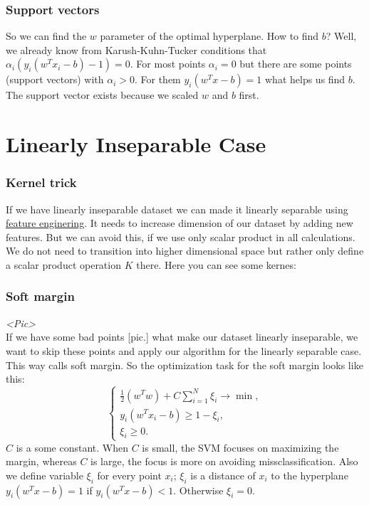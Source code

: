 \subsubsection*{Support vectors}

So we can find the $w$ parameter of the optimal hyperplane. How to find $b$? Well, we already know from Karush-Kuhn-Tucker conditions that $\alpha_i(y_i(w^Tx_i-b)-1)=0$. For most points $\alpha_i=0$ but there are some points (support vectors) with $\alpha_i>0$. For them $y_i(w^Tx-b)=1$ what helps us find $b$. The support vector exists because we scaled $w$ and $b$ first.

\section{Linearly Inseparable Case}
\vspace{-0.6cm}
\subsubsection*{Kernel trick}

If we have linearly inseparable dataset we can made it linearly separable using \hyperlink{new_features}{feature enginering}. It needs to increase dimension of our dataset by adding new features. But we can avoid this, if we use only scalar product in all calculations. We do not need to transition into higher dimensional space but rather only
define a scalar product operation $K$ there. Here you can see some kernes:\\
{\it <Pics with examples>}

\subsubsection*{Soft margin}

{\it <Pic>}\\
If we have some bad points [pic.] what make our dataset linearly inseparable, we want to skip these points and apply our algorithm for the linearly separable case. This way calls soft margin. So the optimization task for the soft margin looks like this:
$$\begin{cases}
	\frac{1}{2}(w^Tw)+C\sum\limits_{i=1}^{N}\xi_i\to\min, \\
	y_i(w^Tx_i-b)\ge1-\xi_i, \\
	\xi_i\ge0.
\end{cases}$$
$C$ is a some constant. When $C$ is small, the SVM focuses on maximizing the margin, whereas $C$ is large, the focus is more on avoiding missclassification. Also we define variable $\xi_i$ for every point $x_i$; $\xi_i$ is a distance of $x_i$ to the hyperplane $y_i(w^Tx-b)=1$ if $y_i(w^Tx-b)<1$. Otherwise $\xi_i=0$.

